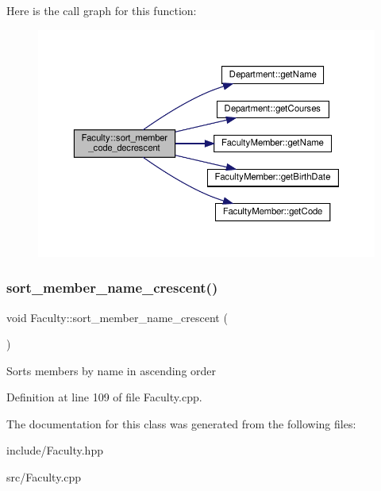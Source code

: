 Here is the call graph for this function\+:\nopagebreak
\begin{figure}[H]
\begin{center}
\leavevmode
\includegraphics[width=350pt]{classFaculty_affc074ff7e6ccca9def97262dc66618e_cgraph}
\end{center}
\end{figure}
\mbox{\label{classFaculty_a1539207b8591b41e32f0108560a7843a}} 
\subsubsection{\texorpdfstring{sort\+\_\+member\+\_\+name\+\_\+crescent()}{sort\_member\_name\_crescent()}}
{\footnotesize\ttfamily void Faculty\+::sort\+\_\+member\+\_\+name\+\_\+crescent (\begin{DoxyParamCaption}{ }\end{DoxyParamCaption})}

Sorts members by name in ascending order 

Definition at line 109 of file Faculty.\+cpp.



The documentation for this class was generated from the following files\+:\begin{DoxyCompactItemize}
\item 
include/Faculty.\+hpp\item 
src/Faculty.\+cpp\end{DoxyCompactItemize}
